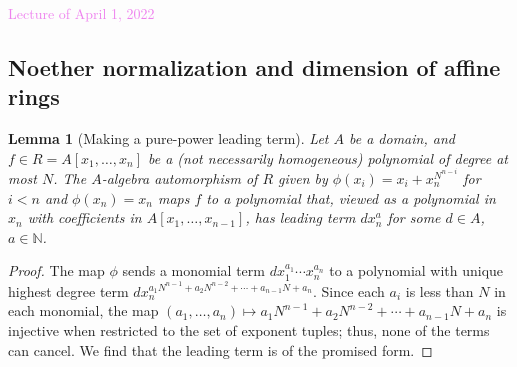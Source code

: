 \documentclass{amsart}[12pt]
\newcommand{\Apr}[1]{\textcolor{violet}{Lecture of April #1, 2022}}
\newcommand{\NN}{\mathbb{N}}
\numberwithin{equation}{section}
\theoremstyle{plain} %
\newtheorem{lemma}[equation]{Lemma}
\theoremstyle{definition}
\theoremstyle{remark}
\begin{document}
\Apr{1}

\subsection{Noether normalization and dimension of affine rings}

\begin{lemma}[Making a pure-power leading term]
Let $A$ be a domain, and $f\in R=A[x_1,\dots,x_n]$ be a (not necessarily homogeneous) polynomial of degree at most $N$. The $A$-algebra automorphism of $R$ given by $\phi(x_i)=x_i + x_n^{N^{n-i}}$ for $i<n$ and $\phi(x_n)=x_n$ maps $f$ to a polynomial that, viewed as a polynomial in $x_n$ with coefficients in $A[x_1,\dots,x_{n-1}]$, has leading term $d x_n^a$ for some $d\in A$, $a\in \NN$.
\end{lemma}
\begin{proof}
The map $\phi$ sends a monomial term $d x_1^{a_1} \cdots x_n^{a_n}$ to a polynomial with unique highest degree term $d x_n^{a_1 N^{n-1} + a_2 N^{n-2} + \cdots + a_{n-1} N + a_n}$. Since each $a_i$ is less than $N$ in each monomial, the map $(a_1,\dots,a_n)\mapsto a_1 N^{n-1} + a_2 N^{n-2} + \cdots + a_{n-1} N + a_n$ is injective when restricted to the set of exponent tuples; thus, none of the terms can cancel. We find that the leading term is of the promised form.
\end{proof}
\end{document}
